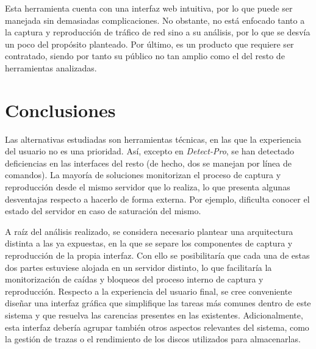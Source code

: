 Esta herramienta cuenta con una interfaz web intuitiva, por lo que puede ser manejada sin demasiadas complicaciones.
No obstante, no está enfocado tanto a la captura y reproducción de tráfico de red sino a su análisis, por lo que se desvía un poco del propósito planteado.
Por último, es un producto que requiere ser contratado, siendo por tanto su público no tan amplio como el del resto de herramientas analizadas.

\section{Conclusiones\label{sec:eda:conclusiones}}

Las alternativas estudiadas son herramientas técnicas, en las que la experiencia del usuario no es una prioridad.
Así, excepto en \textit{Detect-Pro}, se han detectado deficiencias en las interfaces del resto (de hecho, dos se manejan por línea de comandos).
La mayoría de soluciones monitorizan el proceso de captura y reproducción desde el mismo servidor que lo realiza, lo que presenta algunas desventajas respecto a hacerlo de forma externa.
Por ejemplo, dificulta conocer el estado del servidor en caso de saturación del mismo.

A raíz del análisis realizado, se considera necesario plantear una arquitectura distinta a las ya expuestas, en la que se separe los componentes de captura y reproducción de la propia interfaz.
Con ello se posibilitaría que cada una de estas dos partes estuviese alojada en un servidor distinto, lo que facilitaría la monitorización de caídas y bloqueos del proceso interno de captura y reproducción.
Respecto a la experiencia del usuario final, se cree conveniente diseñar una interfaz gráfica que simplifique las tareas más comunes dentro de este sistema y que resuelva las carencias presentes en las existentes.
Adicionalmente, esta interfaz debería agrupar también otros aspectos relevantes del sistema, como la gestión de \glspl{traza} o el rendimiento de los discos utilizados para almacenarlas.
